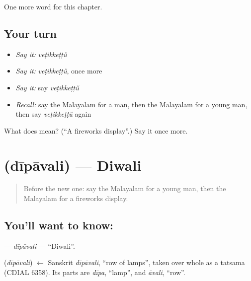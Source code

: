\begin{grammarlens}[title={What you've built}]
One more word for this chapter.
\end{grammarlens}

\subsection*{Your turn}
\begin{itemize}
\raggedright
  \item \emph{Say it:} \emph{veṭikkeṭṭŭ}
  \item \emph{Say it:} \emph{veṭikkeṭṭŭ}, once more
  \item \emph{Say it:} say \emph{veṭikkeṭṭŭ}
  \item \emph{Recall:} say the Malayalam for a man, then the Malayalam for a young man, then say \emph{veṭikkeṭṭŭ} again
\end{itemize}

\begin{tcolorbox}[breakable,colback=teal!4,colframe=teal!35!black,title={Before you move on}]
What does  mean? (\textquotedblleft{}A fireworks display\textquotedblright{}.) Say it once more.
\end{tcolorbox}
\section[\texorpdfstring{\ml{ദീപാവലി} (dīpāvali)}{ദീപാവലി (dīpāvali)}]{ (dīpāvali) — Diwali}

\label{lesson:ML-C326-dipavali}



\begin{quote}
Before the new one: say the Malayalam for a young man, then the Malayalam for a fireworks display.
\end{quote}

\subsection*{You'll want to know: }
\textbf{} — \emph{dīpāvali} — \textquotedblleft{}Diwali\textquotedblright{}.

\begin{cousinweb}
\textbf{} (\emph{dīpāvali}) $\leftarrow$ Sanskrit \emph{dīpāvali}, \textquotedblleft{}row of lamps\textquotedblright{}, taken over whole as a tatsama (CDIAL 6358). Its parts are \emph{dīpa}, \textquotedblleft{}lamp\textquotedblright{}, and \emph{āvali}, \textquotedblleft{}row\textquotedblright{}.
\end{cousinweb}

